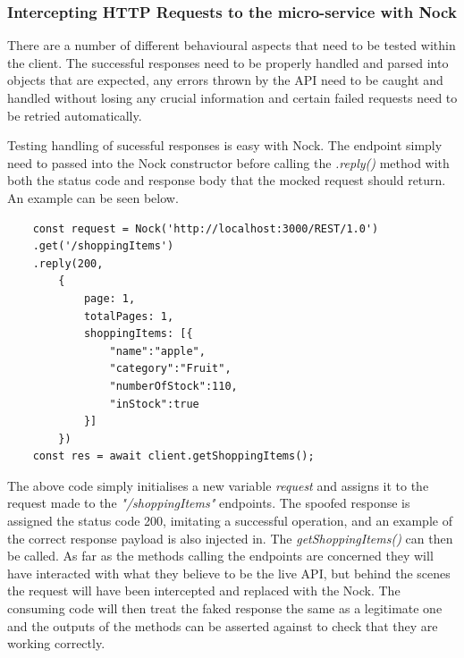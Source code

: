 \subsubsection{Intercepting HTTP Requests to the micro-service with Nock}
There are a number of different behavioural aspects that need to be tested within the client. The successful responses need to be properly handled and parsed into objects that are expected, any errors thrown by the API need to be caught and handled without losing any crucial information and certain failed requests need to be retried automatically.

Testing handling of sucessful responses is easy with Nock. The endpoint simply need to passed into the Nock constructor before calling the \textit{.reply()} method with both the status code and response body that the mocked request should return. An example can be seen below.
\begin{verbatim}
    const request = Nock('http://localhost:3000/REST/1.0')
    .get('/shoppingItems') 
    .reply(200,
        {
            page: 1,
            totalPages: 1,
            shoppingItems: [{
                "name":"apple",
                "category":"Fruit",
                "numberOfStock":110,
                "inStock":true
            }]
        })
    const res = await client.getShoppingItems();
\end{verbatim}
The above code simply initialises a new variable \textit{request} and assigns it to the request made to the \textit{"/shoppingItems"} endpoints. The spoofed response is assigned the status code 200, imitating a successful operation, and an example of the correct response payload is also injected in. The \textit{getShoppingItems()} can then be called. As far as the methods calling the endpoints are concerned they will have interacted with what they believe to be the live API, but behind the scenes the request will have been intercepted and replaced with the Nock. The consuming code will then treat the faked response the same as a legitimate one and the outputs of the methods can be asserted against to check that they are working correctly.

